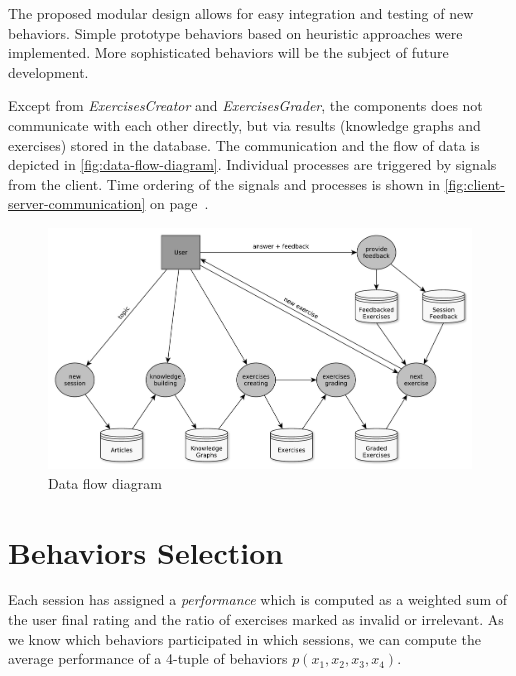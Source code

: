 \documentclass[12pt, twoside]{fithesis2}
\renewcommand{\_}{\leavevmode \kern0.07em\vbox{\hrule width0.4em}}
\begin{document}
The proposed modular design allows for easy integration and testing of new behaviors.
Simple prototype behaviors based on heuristic approaches were implemented.
More sophisticated behaviors will be the subject of future development.

Except from \textit{ExercisesCreator} and \textit{ExercisesGrader},
the components does not communicate with each other directly,
but via results (knowledge graphs and exercises) stored in the database.
The communication and the flow of data is depicted in \autoref{fig:data-flow-diagram}.
Individual processes are triggered by signals from the client.
Time ordering of the signals and processes is shown in \autoref{fig:client-server-communication}
on page~\pageref{fig:client-server-communication}.

\begin{figure}[h]
  \centering
  \includegraphics[width=\textwidth]{images/data-flow-diagram.pdf}
  \caption{Data flow diagram}
  \label{fig:data-flow-diagram}
\end{figure}

\section{Behaviors Selection}
\label{sec:smartoo-behaviors-selection}

Each session has assigned a \textit{performance} which is computed as a weighted sum of the user final rating and the ratio of exercises marked as invalid or irrelevant.
As we know which behaviors participated in which sessions, we can compute the average performance of a 4-tuple of behaviors $p(x_1, x_2, x_3, x_4)$.
\end{document}
